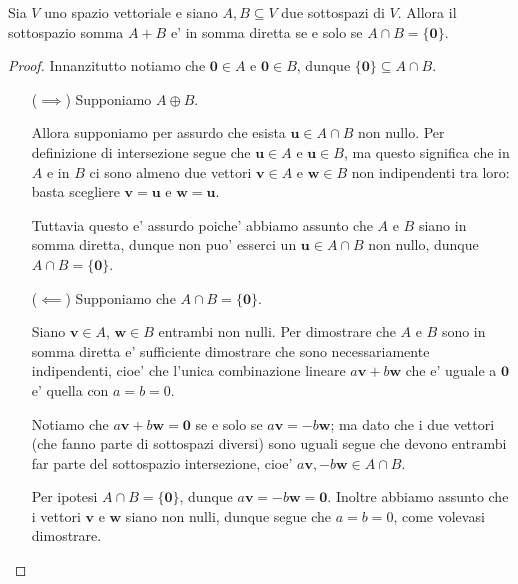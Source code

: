 \begin{proposition}
    Sia $V$ uno spazio vettoriale e siano $A, B \subseteq V$ due sottospazi di $V$. Allora il sottospazio somma $A + B$ e' in somma diretta se e solo se $A \cap B = \{\bm 0\}$.
\end{proposition}
\begin{proof}
    Innanzitutto notiamo che $\bm{0} \in A$ e $\bm 0 \in B$, dunque $\{\bm 0\} \subseteq A \cap B$.
    \begin{itemize}
        \item[($\implies$)] Supponiamo $A \oplus B$. 
        
        Allora supponiamo per assurdo che esista $\bm u \in A \cap B$ non nullo. Per definizione di intersezione segue che $\bm u \in A$ e $\bm u \in B$, ma questo significa che in $A$ e in $B$ ci sono almeno due vettori $\bm v \in A$ e $\bm w \in B$ non indipendenti tra loro: basta scegliere $\bm v = \bm u$ e $\bm w = \bm u$. 
        
        Tuttavia questo e' assurdo poiche' abbiamo assunto che $A$ e $B$ siano in somma diretta, dunque non puo' esserci un $\bm u \in A \cap B$ non nullo, dunque $A \cap B = \{\bm 0\}$.
        \item[($\impliedby$)] Supponiamo che $A \cap B = \{\bm 0\}$. 
        
        Siano $\bm v \in A$, $\bm{w} \in B$ entrambi non nulli. Per dimostrare che $A$ e $B$ sono in somma diretta e' sufficiente dimostrare che sono necessariamente indipendenti, cioe' che l'unica combinazione lineare $a\bm v + b\bm w$ che e' uguale a $\bm 0$ e' quella con $a = b = 0$. 
        
        Notiamo che $a\bm v + b\bm w = \bm 0$ se e solo se $a\bm v = -b\bm w$; ma dato che i due vettori (che fanno parte di sottospazi diversi) sono uguali segue che devono entrambi far parte del sottospazio intersezione, cioe' $a\bm v, -b\bm w \in A \cap B$.
        
        Per ipotesi $A \cap B = \{\bm 0\}$, dunque $a\bm v = -b\bm w = \bm 0$. Inoltre abbiamo assunto che i vettori $\bm v$ e $\bm{w}$ siano non nulli, dunque segue che $a = b = 0$, come volevasi dimostrare. \qedhere
    \end{itemize}
\end{proof}

